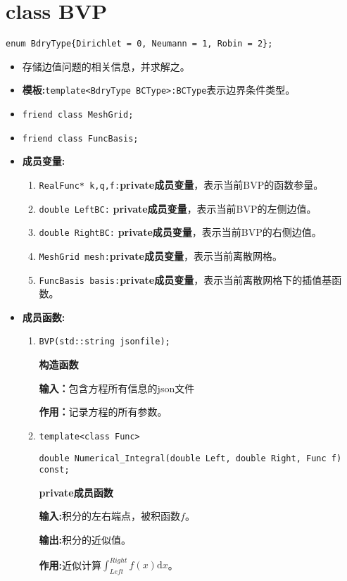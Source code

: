 \documentclass[UTF8]{ctexart}
\theoremstyle{plain}
\theoremstyle{definition}
\theoremstyle{remark}
\newcommand{\dif}{\mathrm{d}}
\begin{document}
\section{class BVP}
\texttt{enum BdryType\{Dirichlet = 0, Neumann = 1, Robin = 2\};}
\begin{itemize}
    \item 存储边值问题的相关信息，并求解之。
    \item \textbf{模板:}\texttt{template<BdryType BCType>:}\texttt{BCType}表示边界条件类型。
    \item \texttt{friend class MeshGrid;}
    \item \texttt{friend class FuncBasis;}
    \item \textbf{成员变量:}
    \begin{enumerate}
        \item \texttt{RealFunc* k,q,f:}\textbf{private成员变量}，表示当前BVP的函数参量。
        \item \texttt{double LeftBC:}
        \textbf{private成员变量}，表示当前BVP的左侧边值。
        \item \texttt{double RightBC:}
        \textbf{private成员变量}，表示当前BVP的右侧边值。
        \item \texttt{MeshGrid mesh:}\textbf{private成员变量}，表示当前离散网格。
        \item \texttt{FuncBasis basis:}\textbf{private成员变量}，表示当前离散网格下的插值基函数。
    \end{enumerate}
    \item \textbf{成员函数:}
    \begin{enumerate}
        \item \texttt{BVP(std::string jsonfile);}
        
        \textbf{构造函数}

        \textbf{输入：}包含方程所有信息的json文件

        \textbf{作用：}记录方程的所有参数。
        
        \item 
        \texttt{template<class Func>}

        \texttt{double Numerical\_Integral(double Left, double Right, Func f) const;}

        \textbf{private成员函数}

        \textbf{输入:}积分的左右端点，被积函数$f$。

        \textbf{输出:}积分的近似值。

        \textbf{作用:}近似计算$\int_{Left}^{Right}f(x)\dif x$。


\end{enumerate}
\end{itemize}
\end{document}

